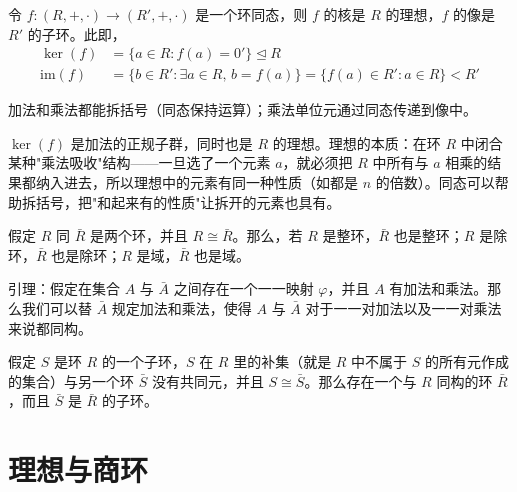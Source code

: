 \begin{proposition}
令 $f:(R,+,\cdot)\to(R',+,\cdot)$ 是一个环同态，则 $f$ 的核是 $R$ 的理想，$f$ 的像是 $R'$ 的子环。此即，
\begin{align}
\ker(f)&=\{a\in R:f(a)=0'\}\trianglelefteq R\\
\mathrm{im}(f)&=\{b\in R':\exists a\in R,\,b=f(a)\}=\{f(a)\in R':a\in R\}<R'
\end{align}
\end{proposition}

\begin{note}[定义2 9环同态]
加法和乘法都能拆括号（同态保持运算）；乘法单位元通过同态传递到像中。
\end{note}

\begin{note}
$\ker(f)$ 是加法的正规子群，同时也是 $R$ 的理想。理想的本质：在环 $R$ 中闭合某种"乘法吸收"结构——一旦选了一个元素 $a$，就必须把 $R$ 中所有与 $a$ 相乘的结果都纳入进去，所以理想中的元素有同一种性质（如都是 $n$ 的倍数）。同态可以帮助拆括号，把"和起来有的性质"让拆开的元素也具有。
\end{note}

\begin{theorem}
假定 $R$ 同 $\bar{R}$ 是两个环，并且 $R\cong\bar{R}$。那么，若 $R$ 是整环，$\bar{R}$ 也是整环；$R$ 是除环，$\bar{R}$ 也是除环；$R$ 是域，$\bar{R}$ 也是域。

引理：假定在集合 $A$ 与 $\bar{A}$ 之间存在一个一一映射 $\varphi$，并且 $A$ 有加法和乘法。那么我们可以替 $\bar{A}$ 规定加法和乘法，使得 $A$ 与 $\bar{A}$ 对于一一对加法以及一一对乘法来说都同构。
\end{theorem}

\begin{theorem}[定理 4]
假定 $S$ 是环 $R$ 的一个子环，$S$ 在 $R$ 里的补集（就是 $R$ 中不属于 $S$ 的所有元作成的集合）与另一个环 $\bar{S}$ 没有共同元，并且 $S\cong\bar{S}$。那么存在一个与 $R$ 同构的环 $\bar{R}$，而且 $\bar{S}$ 是 $\bar{R}$ 的子环。
\end{theorem}

\section{理想与商环}

